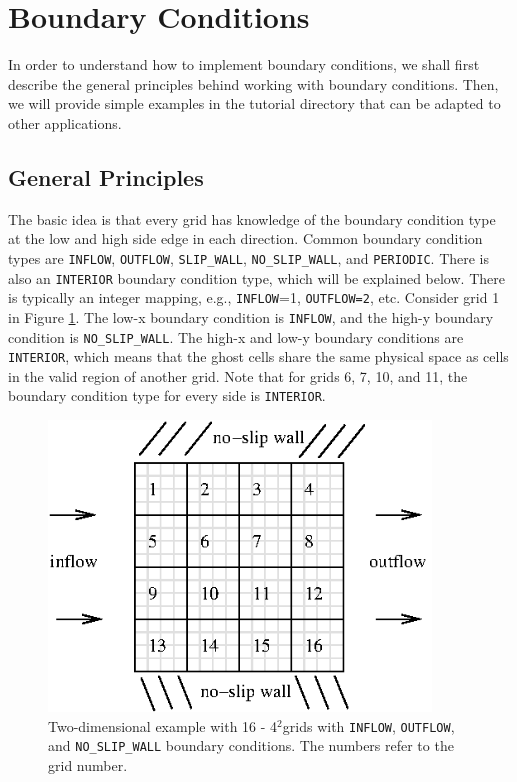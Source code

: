 \section{Boundary Conditions}
In order to understand how to implement boundary conditions, we shall 
first describe the general principles behind working with boundary conditions.
Then, we will provide simple examples in the tutorial directory that can be 
adapted to other applications.

\subsection{General Principles}
The basic idea is that every grid has knowledge of the
boundary condition type at the low and high side edge in each direction.
Common boundary condition types are {\tt INFLOW}, {\tt OUTFLOW}, {\tt SLIP\_WALL},
{\tt NO\_SLIP\_WALL}, and {\tt PERIODIC}.
There is also an {\tt INTERIOR} boundary condition type, which 
will be explained below.  There is typically an integer mapping, e.g., {\tt INFLOW}=1,
{\tt OUTFLOW=2}, etc.  Consider grid 1 in Figure \ref{fig:bc_example1}.  The
low-x boundary condition is {\tt INFLOW}, and the high-y boundary condition is
{\tt NO\_SLIP\_WALL}.  The high-x and low-y boundary conditions are {\tt INTERIOR}, which
means that the ghost cells share the same physical space as cells in the valid region of 
another grid.  Note that for grids 6, 7, 10, and 11, the boundary condition type for
every side is {\tt INTERIOR}.
\begin{figure}[tb]
\centering
\includegraphics[width=4in]{./AdvancedTopics/bc_example1}
\caption{\label{fig:bc_example1}Two-dimensional example with 16 - 4$^2$grids with
{\tt INFLOW}, {\tt OUTFLOW}, and {\tt NO\_SLIP\_WALL} boundary conditions.
The numbers refer to the grid number.}
\end{figure}

